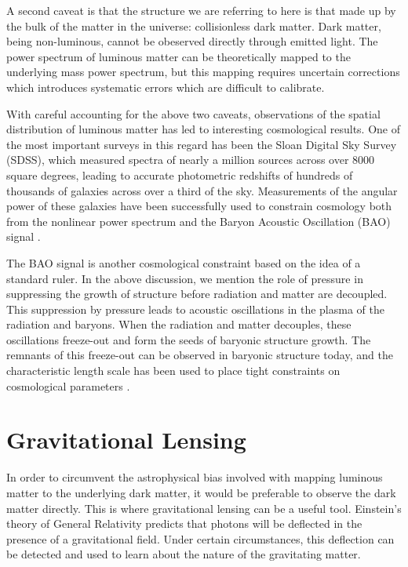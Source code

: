 A second caveat is that
the structure we are referring to here is that made up by the bulk
of the matter in the universe: collisionless dark matter.  Dark matter,
being non-luminous, cannot be obeserved directly through emitted light.
The power spectrum of luminous matter can be theoretically mapped to the
underlying mass power spectrum, but this mapping requires uncertain
corrections which introduces systematic errors which are difficult to
calibrate.

With careful accounting for the above two caveats, observations of the spatial
distribution of luminous matter has led to interesting cosmological results.
One of the most important surveys in this regard has been the Sloan Digital
Sky Survey (SDSS), which measured spectra of nearly a million sources across
over 8000 square degrees, leading to accurate photometric redshifts of
hundreds of thousands of galaxies across over a third of the sky.
Measurements of the angular power of these galaxies have been successfully
used to constrain cosmology both from the nonlinear power spectrum
\citep{Tegmark06} and the Baryon Acoustic Oscillation (BAO) signal
\citep{Eisenstein05}.

The BAO signal is another cosmological constraint based on the idea of a
standard ruler.  In the above discussion, we mention the role of pressure
in suppressing the growth of structure before radiation and matter are
decoupled.  This suppression by pressure leads to acoustic oscillations
in the plasma of the radiation and baryons.  When the radiation and matter
decouples, these oscillations freeze-out and form the seeds of baryonic
structure growth.  The remnants of this freeze-out can be observed in
baryonic structure today, and the characteristic length scale has been
used to place tight constraints on cosmological parameters
\citep{Eisenstein05}.


\section{Gravitational Lensing}
\label{sec:gravitational_lensing}
In order to circumvent the astrophysical bias
involved with mapping luminous matter to
the underlying dark matter, it would be preferable to observe the dark
matter directly.  This is where gravitational lensing can be a
useful tool.
Einstein's theory of General Relativity predicts that photons will be deflected
in the presence of a gravitational field.  Under certain circumstances, this
deflection can be detected and used to learn about the nature of the
gravitating matter.

